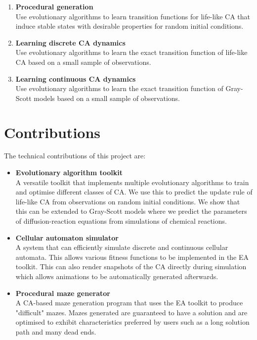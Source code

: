 \begin{enumerate}
    \item \textbf{Procedural generation}\label{obj-1}\\
    Use evolutionary algorithms to learn transition functions for life-like CA that induce stable states with desirable properties for random initial conditions.
    \item \textbf{Learning discrete CA dynamics}\label{obj-1}\\
    Use evolutionary algorithms to learn the exact transition function of life-like CA based on a small sample of observations.
    \item \textbf{Learning continuous CA dynamics}\\
    Use evolutionary algorithms to learn the exact transition function of Gray-Scott models based on a small sample of observations.
\end{enumerate}



\section{Contributions}
The technical contributions of this project are:
\begin{itemize}
    \item \textbf{Evolutionary algorithm toolkit}\\ A versatile toolkit that implements multiple evolutionary algorithms to train and optimise different classes of CA. We use this to predict the update rule of life-like CA from observations on random initial conditions. We show that this can be extended to Gray-Scott models where we predict the parameters of diffusion-reaction equations from simulations of chemical reactions.
    \item \textbf{Cellular automaton simulator}\\ A system that can efficiently simulate discrete and continuous cellular automata. This allows various fitness functions to be implemented in the EA toolkit. This can also render snapshots of the CA directly during simulation which allows animations to be automatically generated afterwards.
    \item \textbf{Procedural maze generator}\\ A CA-based maze generation program that uses the EA toolkit to produce "difficult" mazes. Mazes generated are guaranteed to have a solution and are optimised to exhibit characteristics preferred by users such as a long solution path and many dead ends.
\end{itemize}


